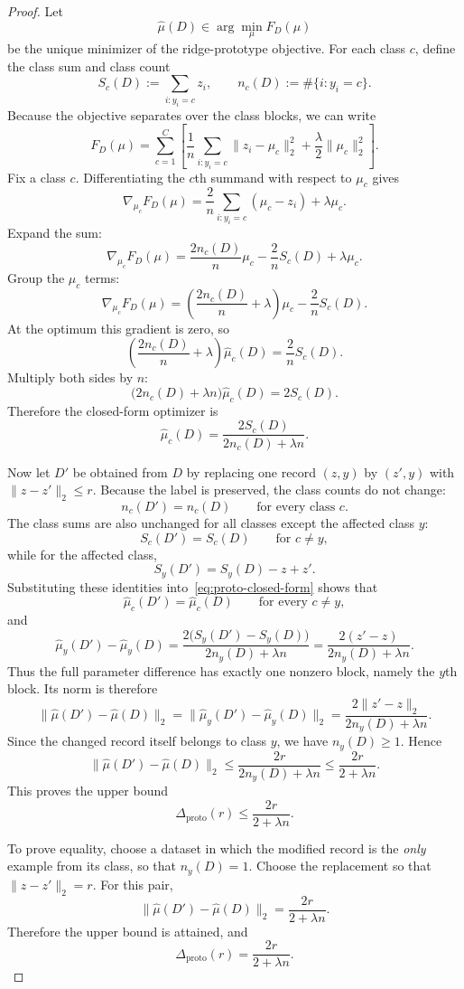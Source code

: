 \documentclass[11pt,a4paper]{report}
\theoremstyle{plain}
\theoremstyle{definition}
\theoremstyle{remark}
\begin{document}
\begin{proof}
Let
\[
\widehat\mu(D)\in\arg\min_\mu F_D(\mu)
\]
be the unique minimizer of the ridge-prototype objective. For each class $c$, define the class sum and class count
\[
S_c(D):=\sum_{i:y_i=c} z_i,
\qquad
n_c(D):=\#\{i:y_i=c\}.
\]
Because the objective separates over the class blocks, we can write
\[
F_D(\mu)
=
\sum_{c=1}^C
\left[
\frac{1}{n}\sum_{i:y_i=c}\|z_i-\mu_c\|_2^2
+
\frac{\lambda}{2}\|\mu_c\|_2^2
\right].
\]
Fix a class $c$. Differentiating the $c$th summand with respect to $\mu_c$ gives
\[
\nabla_{\mu_c}F_D(\mu)
=
\frac{2}{n}\sum_{i:y_i=c}(\mu_c-z_i)+\lambda\mu_c.
\]
Expand the sum:
\[
\nabla_{\mu_c}F_D(\mu)
=
\frac{2n_c(D)}{n}\mu_c-
\frac{2}{n}S_c(D)+\lambda\mu_c.
\]
Group the $\mu_c$ terms:
\[
\nabla_{\mu_c}F_D(\mu)
=
\left(\frac{2n_c(D)}{n}+\lambda\right)\mu_c-
\frac{2}{n}S_c(D).
\]
At the optimum this gradient is zero, so
\[
\left(\frac{2n_c(D)}{n}+\lambda\right)\widehat\mu_c(D)=\frac{2}{n}S_c(D).
\]
Multiply both sides by $n$:
\[
\bigl(2n_c(D)+\lambda n\bigr)\widehat\mu_c(D)=2S_c(D).
\]
Therefore the closed-form optimizer is
\begin{equation}
\label{eq:proto-closed-form}
\widehat\mu_c(D)=\frac{2S_c(D)}{2n_c(D)+\lambda n}.
\end{equation}

Now let $D'$ be obtained from $D$ by replacing one record $(z,y)$ by $(z',y)$ with $\|z-z'\|_2\le r$. Because the label is preserved, the class counts do not change:
\[
n_c(D')=n_c(D)\qquad \text{for every class }c.
\]
The class sums are also unchanged for all classes except the affected class $y$:
\[
S_c(D')=S_c(D)\qquad \text{for }c\neq y,
\]
while for the affected class,
\[
S_y(D')=S_y(D)-z+z'.
\]
Substituting these identities into~\eqref{eq:proto-closed-form} shows that
\[
\widehat\mu_c(D')=\widehat\mu_c(D)\qquad \text{for every }c\neq y,
\]
and
\[
\widehat\mu_y(D')-
\widehat\mu_y(D)
=
\frac{2\bigl(S_y(D')-S_y(D)\bigr)}{2n_y(D)+\lambda n}
=
\frac{2(z'-z)}{2n_y(D)+\lambda n}.
\]
Thus the full parameter difference has exactly one nonzero block, namely the $y$th block. Its norm is therefore
\[
\|\widehat\mu(D')-\widehat\mu(D)\|_2
=
\|\widehat\mu_y(D')-\widehat\mu_y(D)\|_2
=
\frac{2\|z'-z\|_2}{2n_y(D)+\lambda n}.
\]
Since the changed record itself belongs to class $y$, we have $n_y(D)\ge 1$. Hence
\[
\|\widehat\mu(D')-\widehat\mu(D)\|_2
\le
\frac{2r}{2n_y(D)+\lambda n}
\le
\frac{2r}{2+\lambda n}.
\]
This proves the upper bound
\[
\Delta_{\mathrm{proto}}(r)\le \frac{2r}{2+\lambda n}.
\]

To prove equality, choose a dataset in which the modified record is the \emph{only} example from its class, so that $n_y(D)=1$. Choose the replacement so that $\|z-z'\|_2=r$. For this pair,
\[
\|\widehat\mu(D')-\widehat\mu(D)\|_2
=
\frac{2r}{2+\lambda n}.
\]
Therefore the upper bound is attained, and
\[
\Delta_{\mathrm{proto}}(r)=\frac{2r}{2+\lambda n}.
\]
\end{proof}
\end{document}
